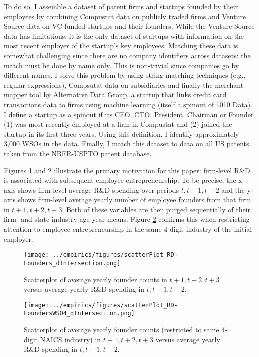 \documentclass[11pt,english]{article}
\begin{document}
To do so, I assemble a dataset of parent firms and startups founded by their employees by combining Compustat data on publicly traded firms and Venture Source data on VC-funded startups and their founders. While the Venture Source data has limitations, it is the only dataset of startups with information on the most recent employer of the startup's key employees. Matching these data is somewhat challenging since there are no company identifiers across datasets: the match must be done by name only. This is non-trivial since companies go by different names. I solve this problem by using string matching techniques (e.g., regular expressions), Compsutat data on subsidiaries and finally the merchant-mapper tool by Alternative Data Group, a startup that links credit card transactions data to firms using machine learning (itself a spinout of 1010 Data). I define a startup as a spinout if its CEO, CTO, President, Chairman or Founder (1) was most recently employed at a firm in Compustat and (2) joined the startup in its first three years. Using this definition, I identify approximately 3,000 WSOs in the data. Finally, I match this dataset to data on all US patents taken from the NBER-USPTO patent database.

Figures \ref{figure:scatterPlot_RD-Founders_dIntersection} and \ref{figure:scatterPlot_RD-FoundersWSO4_dIntersection} illustrate the primary motivation for this paper: firm-level R\&D is associated with subsequent employee entrepreneurship. To be precise, the x-axis shows firm-level average R\&D spending over periods $t,t-1,t-2$ and the y-axis shows firm-level average yearly number of employee founders from that firm in $t+1,t+2,t+3$. Both of these variables are then purged sequentially of their firm- and state-industry-age-year means. Figure \ref{figure:scatterPlot_RD-FoundersWSO4_dIntersection} confirms this when restricting attention to employee entrepreneurship in the same 4-digit industry of the initial employer. 

\begin{figure}[]
	\centering
	\texttt{[image: ../empirics/figures/scatterPlot\_RD-Founders\_dIntersection.png]}
	\caption{Scatterplot of average yearly founder counts in $t+1,t+2,t+3$ versus average yearly R\&D spending in $t,t-1,t-2$.}
	\label{figure:scatterPlot_RD-Founders_dIntersection}
\end{figure}

\begin{figure}[]
	\centering
	\texttt{[image: ../empirics/figures/scatterPlot\_RD-FoundersWSO4\_dIntersection.png]}
	\caption{Scatterplot of average yearly founder counts (restricted to same 4-digit NAICS industry) in $t+1,t+2,t+3$ versus average yearly R\&D spending in $t,t-1,t-2$.}
	\label{figure:scatterPlot_RD-FoundersWSO4_dIntersection}
\end{figure}
\end{document}
